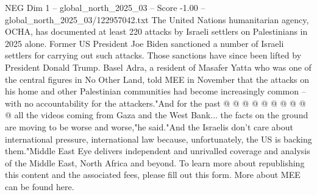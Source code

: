 \begin{textsample}{NEG Dim 1 – global\_north\_2025\_03 – Score -1.00 – global\_north\_2025\_03/122957042.txt}
The United Nations humanitarian agency, OCHA, has documented at least 220 attacks by Israeli settlers on Palestinians in 2025 alone.
Former US President Joe Biden sanctioned a number of Israeli settlers for carrying out such attacks.
Those sanctions have since been lifted by President Donald Trump.
Basel Adra, a resident of Masafer Yatta who was one of the central figures in No Other Land, told MEE in November that the attacks on his home and other Palestinian communities had become increasingly common -- with no accountability for the attackers."And for the past @ @ @ @ @ @ @ @ @ @ all the videos coming from Gaza and the West Bank... the facts on the ground are moving to be worse and worse,"he said."And the Israelis don't care about international pressure, international law because, unfortunately, the US is backing them."Middle East Eye delivers independent and unrivalled coverage and analysis of the Middle East, North Africa and beyond.
To learn more about republishing this content and the associated fees, please fill out this form.
More about MEE can be found here.

\end{textsample}

